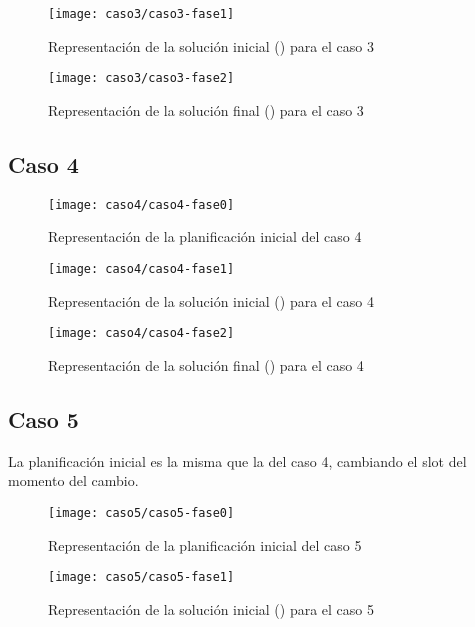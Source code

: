\begin{figure}[!h]
	\centering
	\texttt{[image: caso3/caso3-fase1]}
	\caption{Representación de la solución inicial (\faseuno{}) para el caso 3}
	\label{fig:caso3-fase1}
\end{figure}

\begin{figure}[!h]
	\centering
	\texttt{[image: caso3/caso3-fase2]}
	\caption{Representación de la solución final (\fasedos{}) para el caso 3}
	\label{fig:caso3-fase2}
\end{figure}

\FloatBarrier
\newpage
\subsection{Caso 4}

\begin{figure}[!h]
	\centering
	\texttt{[image: caso4/caso4-fase0]}
	\caption{Representación de la planificación inicial del caso 4}
	\label{fig:caso4-fase0}
\end{figure}

\begin{figure}[!h]
	\centering
	\texttt{[image: caso4/caso4-fase1]}
	\caption{Representación de la solución inicial (\faseuno{}) para el caso 4}
	\label{fig:caso4-fase1}
\end{figure}

\begin{figure}[!h]
	\centering
	\texttt{[image: caso4/caso4-fase2]}
	\caption{Representación de la solución final (\fasedos{}) para el caso 4}
	\label{fig:caso4-fase2}
\end{figure}

\FloatBarrier
\newpage
\subsection{Caso 5}

La planificación inicial es la misma que la del caso 4, cambiando el slot del momento del cambio.

\begin{figure}[!h]
	\centering
	\texttt{[image: caso5/caso5-fase0]}
	\caption{Representación de la planificación inicial del caso 5}
	\label{fig:caso5-fase0}
\end{figure}

\begin{figure}[!h]
	\centering
	\texttt{[image: caso5/caso5-fase1]}
	\caption{Representación de la solución inicial (\faseuno{}) para el caso 5}
	\label{fig:caso5-fase1}
\end{figure}

